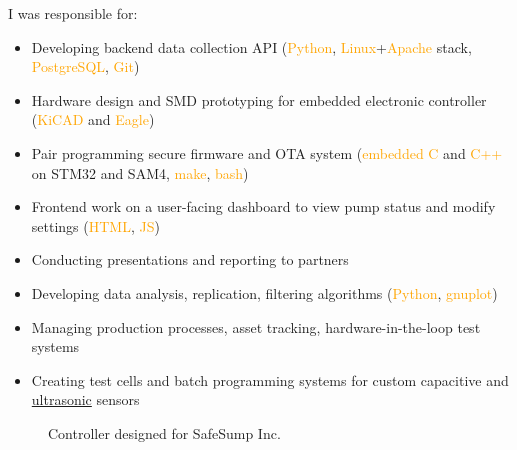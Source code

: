 \documentclass[fleqn,11pt]{article}
\newcommand{\sk}[1]{\textcolor{orange}{#1}}
\newcommand{\itemoptions}{\setlength{\itemindent}{-10pt} \setlength\itemsep{-1em}}
\begin{document}
I was responsible for:
\begin{itemize}\itemoptions
\item Developing backend data collection API (\sk{Python}, \sk{Linux}+\sk{Apache} stack, \sk{PostgreSQL}, \sk{Git}) %
\item Hardware design and SMD prototyping for embedded electronic controller (\sk{KiCAD} and \sk{Eagle})
\item Pair programming secure firmware and OTA system (\sk{embedded C} and \sk{C++} on STM32 and SAM4, \sk{make}, \sk{bash})
\item Frontend work on a user-facing dashboard to view pump status and modify settings (\sk{HTML}, \sk{JS})
\item Conducting presentations and reporting to partners
\item Developing data analysis, replication, filtering algorithms (\sk{Python}, \sk{gnuplot})
\item Managing production processes, asset tracking, hardware-in-the-loop test systems
\item Creating test cells and batch programming systems for custom capacitive and \href{https://github.com/0xDBFB7/UltimateUltrasonicAmplifier}{ultrasonic} sensors
\end{itemize}


\begin{figure}[H]
	\centering
	\captionsetup{labelformat=empty}
	
	\caption*{Controller designed for SafeSump Inc.}
	\hfill
\end{figure}

\end{document}
